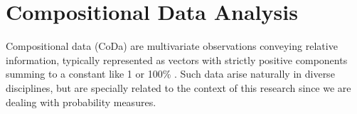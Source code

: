 \documentclass[
	12pt,				%
	oneside,			%
	a4paper,			%
	english,			%
	brazil				%
	]{abntex2ppgsi}
\begin{document}





\section{Compositional Data Analysis}
\label{subsec:CoDa}
Compositional data (CoDa) are multivariate observations conveying relative information, typically represented as vectors with strictly positive components summing to a constant like 1 or 100\% \cite{aitchison1982statistical}. Such data arise naturally in diverse disciplines, but are specially related to the context of this research since we are dealing with probability measures.
\end{document}
